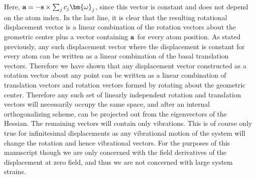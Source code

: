 Here, ${\bf{a}}=-{\bf{s}} \times \sum_j c_j {\bm{\omega}}_j$, since this vector is constant and does not depend on the atom index.  In the last line, it is clear that the resulting rotational displacement vector
is a linear combination of the rotation vectors about the geometric center plus a vector containing ${\bf{a}}$ for every atom position.  As stated previously, any such displacement vector where
the displacement is constant for every atom can be written as a linear combination of the basal translation vectors.  Therefore we have shown that any displacement vector constructed as a rotation
vector about any point can be written as a linear combination of translation vectors and rotation vectors formed by rotating about the geometric center. Therefore any such set of linearly independent rotation and translation
vectors will necessarily occupy the same space, and after an internal orthogonalizing scheme, can be projected out from the eigenvectors of the Hessian.  The remaining vectors will contain only vibrations.  
This is of course only true for infinitesimal displacements as any vibrational motion of the system will change the rotation and hence vibrational vectors.  For the purposes of this manuscript though we 
are only concerned with the field derivatives of the displacement at zero field, and thus we are not concerned with large system strains.  



